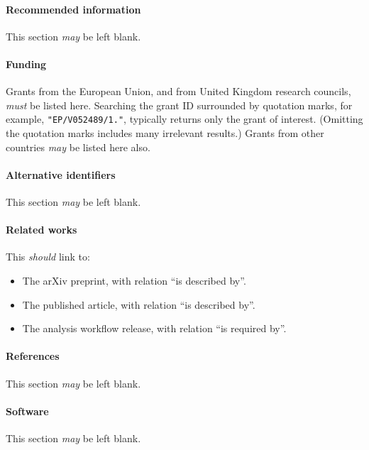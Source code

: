 \documentclass{article}
\newcommand\rfcword[1]{\emph{#1}\xspace}
\newcommand\must{\rfcword{must}}
\newcommand\should{\rfcword{should}}
\newcommand\may{\rfcword{may}}
\begin{document}
\paragraph{Recommended information}

This section \may be left blank.

\paragraph{Funding}

Grants from the European Union,
and from United Kingdom research councils,
\must be listed here.
Searching the grant ID surrounded by quotation marks,
for example,
\verb|"EP/V052489/1."|,
typically returns only the grant of interest.
(Omitting the quotation marks includes many irrelevant results.)
Grants from other countries \may be listed here also.

\paragraph{Alternative identifiers}

This section \may be left blank.

\paragraph{Related works}

This \should link to:
\begin{itemize}
  \item
        The arXiv preprint,
        with relation ``is described by''.
  \item
        The published article,
        with relation ``is described by''.
  \item
        The analysis workflow release,
        with relation ``is required by''.
\end{itemize}

\paragraph{References}

This section \may be left blank.

\paragraph{Software}

This section \may be left blank.
\end{document}
